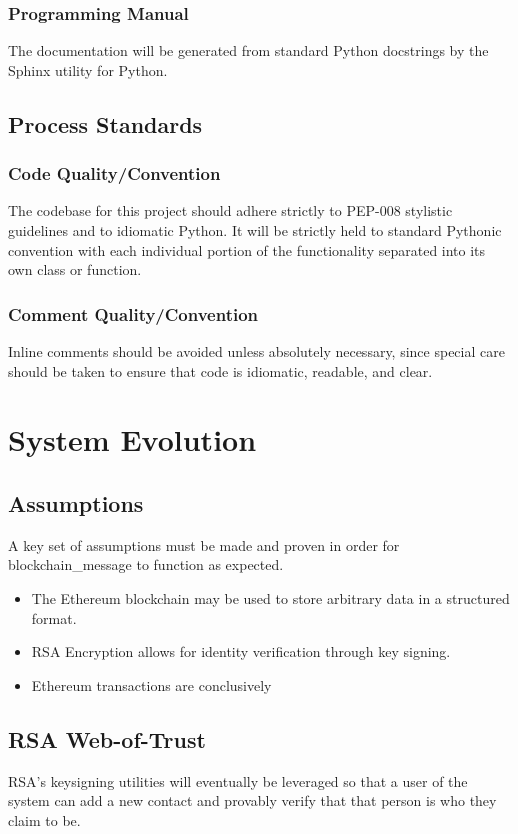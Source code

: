 \documentclass[titlepage]{report}
\begin{document}
\subsubsection{Programming Manual}
The documentation will be generated from standard Python docstrings by the Sphinx utility for Python.

\subsection{Process Standards}
\subsubsection{Code Quality/Convention}
The codebase for this project should adhere strictly to PEP-008 stylistic guidelines and to idiomatic Python. It will be strictly held to standard Pythonic convention with each individual portion of the functionality separated into its own class or function.

\subsubsection{Comment Quality/Convention}
Inline comments should be avoided unless absolutely necessary, since special care should be taken to ensure that code is idiomatic, readable, and clear.

\section{System Evolution}
\subsection{Assumptions}
A key set of assumptions must be made and proven in order for blockchain\_message to function as expected.
\begin{itemize}
    \item The Ethereum blockchain may be used to store arbitrary data in a structured format.
    \item RSA Encryption allows for identity verification through key signing.
    \item Ethereum transactions are conclusively 
\end{itemize}

\subsection{RSA Web-of-Trust}
RSA's keysigning utilities will eventually be leveraged so that a user of the system can add a new contact and provably verify that that person is who they claim to be.
\end{document}
